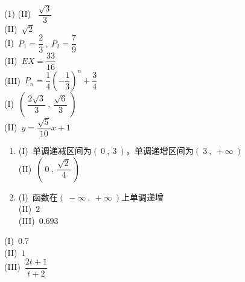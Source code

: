 \documentclass[11pt,a4paper]{ctexart}
\newcounter{chapPage}
\begin{document}
    \begin{tasks}[label=(\arabic*), after-item-skip=0.6em,start=16] (1)
        \task 
        (II) \ $\dfrac{\sqrt{3}}{3}$ \hfill{} \\

        \task
        (II)\ $\sqrt{2}$ \hfill{}\\[0.6em]

        \task
        (I)\ $P_1=\dfrac{2}{3}\ ,\ P_2=\dfrac{7}{9}$ \\[0.6em]
        (II)\ $EX=\dfrac{33}{16}$\\[0.6EM]
        (III)\ $P_n=\dfrac{1}{4}(-\dfrac{1}{3})^n+\dfrac{3}{4}$\hfill{}\\[0.6em]

        \task
        (I)\ $(\ \dfrac{2\sqrt{3}}{3}\ ,\ \dfrac{\sqrt{6}}{3}\ )$ \\[0.6em]
        (II)\ $y=\dfrac{\sqrt{5}}{10}x+1$\hfill{}\\[0.6em]
        
        \task
        \begin{enumerate}[label=(\alph*)]
            \item 
            (I)\ 单调递减区间为$(\ 0\ ,\ 3\ )$，单调递增区间为$(\ 3\ ,\ +\infty\ )$\\[0.6em]
            (II)\ $(\ 0\ ,\ \dfrac{\sqrt{2}}{4}\ )$\hfill{}
            \item 
            (I)\ 函数在$(\ -\infty\ ,\ +\infty\ )$上单调递增\\[0.6em]
            (II)\ $2$\\[0.6em]
            (III)\ $0.693$\hfill{}\\[0.6em]
        \end{enumerate}

        \task
        (I)\ $0.7$\\[0.6em]
        (II)\ $1$\\[0.6em]
        (III)\ $\dfrac{2t+1}{t+2}$\hfill{}
    
    \end{tasks}
    
\clearpage %
\setcounter{enumi}{0}   %
{} %
\setcounter{chapPage}{1} %
\end{document}
